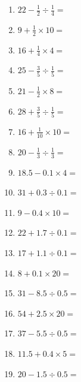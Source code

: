 \documentclass[12pt]{article}
\begin{document}
\begin{enumerate}
\item \large $ 22 - \frac{1}{2} \div \frac{1}{4} = $ \vspace{1.6cm}
\item \large $ 9 + \frac{1}{2} \times 10 = $ \vspace{1.6cm}
\item \large $ 16 + \frac{1}{4} \times 4 = $ \vspace{1.6cm}
\newpage
\item \large $ 25 - \frac{3}{5} \div \frac{1}{5} = $ \vspace{1.6cm}
\item \large $ 21 - \frac{1}{2} \times 8 = $ \vspace{1.6cm}
\item \large $ 28 + \frac{3}{5} \div \frac{1}{5} = $ \vspace{1.6cm}
\item \large $ 16 + \frac{1}{10} \times 10 = $ \vspace{1.6cm}
\item \large $ 20 - \frac{1}{3} \div \frac{1}{3} = $ \vspace{1.6cm}
\item \large $ 18.5 - 0.1 \times 4 = $ \vspace{1.6cm}
\item \large $ 31 + 0.3 \div 0.1 = $ \vspace{1.6cm}
\item \large $ 9 - 0.4 \times 10 = $ \vspace{1.6cm}
\item \large $ 22 + 1.7 \div 0.1 = $ \vspace{1.6cm}
\item \large $ 17 + 1.1 \div 0.1 = $ \vspace{1.6cm}
\newpage
\item \large $ 8 + 0.1 \times 20 = $ \vspace{1.6cm}
\item \large $ 31 - 8.5 \div 0.5 = $ \vspace{1.6cm}
\item \large $ 54 + 2.5 \times 20 = $ \vspace{1.6cm}
\item \large $ 37 - 5.5 \div 0.5 = $ \vspace{1.6cm}
\item \large $ 11.5 + 0.4 \times 5 = $ \vspace{1.6cm}
\item \large $ 20 - 1.5 \div 0.5 = $ \vspace{1.6cm}

\end{enumerate}
\end{document}
